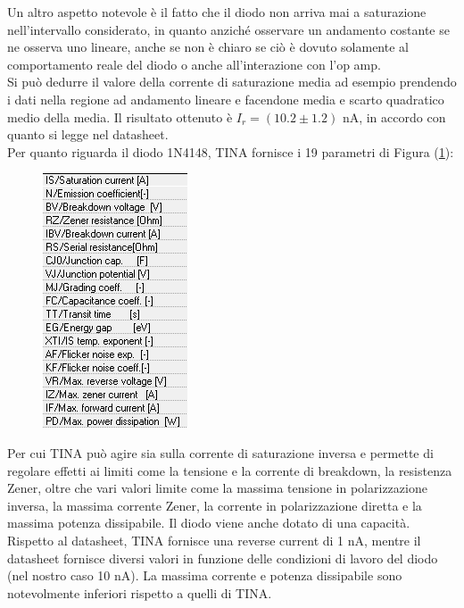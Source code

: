 \documentclass[journal, a4paper]{IEEEtran}
\begin{document}
Un altro aspetto notevole è il fatto che il diodo non arriva mai a saturazione nell'intervallo considerato, in quanto anziché osservare un andamento costante se ne osserva uno lineare, anche se non è chiaro se ciò è dovuto solamente al comportamento reale del diodo o anche all'interazione con l'op amp.\\
Si può dedurre il valore della corrente di saturazione media ad esempio prendendo i dati nella regione ad andamento lineare e facendone media e scarto quadratico medio della media. Il risultato ottenuto è $I_r = (10.2 \pm 1.2)$ nA, in accordo con quanto si legge nel datasheet.\\

Per quanto riguarda il diodo 1N4148, TINA fornisce i 19 parametri di Figura (\ref{dati_Tina}):\\

\begin{figure}[htp]
\caption{}
\label{dati_Tina}
\centering
\includegraphics[scale=.7]{dati_Tina}
\end{figure}


Per cui TINA può agire sia sulla corrente di saturazione inversa e permette di regolare effetti ai limiti come la tensione e la corrente di breakdown, la resistenza Zener, oltre che vari valori limite come la massima tensione in polarizzazione inversa, la massima corrente Zener, la corrente in polarizzazione diretta e la massima potenza dissipabile. Il diodo viene anche dotato di una capacità. Rispetto al datasheet, TINA fornisce una reverse current di 1 nA, mentre il datasheet fornisce diversi valori in funzione delle condizioni di lavoro del diodo (nel nostro caso 10 nA). La massima corrente e potenza dissipabile sono notevolmente inferiori rispetto a quelli di TINA.\\
\end{document}
